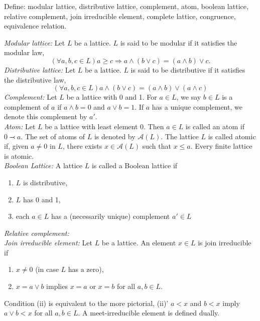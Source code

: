 \documentclass[12pt]{article}
\begin{document}
\begin{prob}
    Define: modular lattice, distributive lattice, complement, atom, boolean lattice, relative complement, join irreducible element, complete lattice, congruence, equivalence relation.
\end{prob}
\begin{soln}
    \emph{Modular lattice:}
    Let \(L\) be a lattice. \(L\) is said to be modular if it satisfies the modular law,
    \[(\forall a, b, c \in L) a \geq c \Rightarrow a \wedge (b \vee c) = (a \wedge b) \vee c.\]
    \emph{Distributive lattice:}
    Let \(L\) be a lattice. \(L\) is said to be distributive if it satisfies the distributive law,
    \[(\forall a, b, c \in L) a \wedge (b \vee c) = (a \wedge b) \vee (a \wedge c)\]
    \emph{Complement: } Let \(L\) be a lattice with 0 and 1. For \(a \in L\), we
    say \(b \in L\) is a complement of \(a\) if \(a \wedge b = 0\) and \(a \vee b = 1\). If \(a\) has a unique complement, we denote this complement by \(a'\).\\


    \emph{Atom:} Let \(L\) be a lattice with least element 0. Then \(a \in L\) is called an atom if \(0 \lefttail a\). The set of atoms of \(L\) is denoted by \(\mathcal{A}(L)\). The lattice \(L\) is called atomic if, given \(a \neq 0\) in \(L\), there exists \(x \in \mathcal{A}(L)\) such that \(x \leq a\). Every finite lattice is atomic.\\

    \emph{Boolean Lattice: } A lattice \(L\) is called a Boolean lattice if
    \begin{enumerate}[label=(\roman*)]
        \item \(L\) is distributive,
        \item \(L\) has 0 and 1,
        \item each \(a \in L\) has a (necessarily unique) complement \(a' \in L\)
    \end{enumerate}

    \emph{Relative complement:}\\

    \emph{Join irreducible element: } Let \(L\) be a lattice. An element \(x \in L\) is join irreducible if
    \begin{enumerate}[label=(\roman*)]
        \item \(x \neq 0\) (in case \(L\) has a zero),
        \item \(x = a \vee b\) implies \(x = a\) or \(x = b\) for all \(a, b \in L\).
    \end{enumerate}
    Condition (ii) is equivalent to the more pictorial,
    (ii)' \(a < x\) and \(b < x\) imply \(a \vee b < x\) for all \(a, b \in L\). A meet-irreducible element is defined dually.\\


\end{soln}
\end{document}
